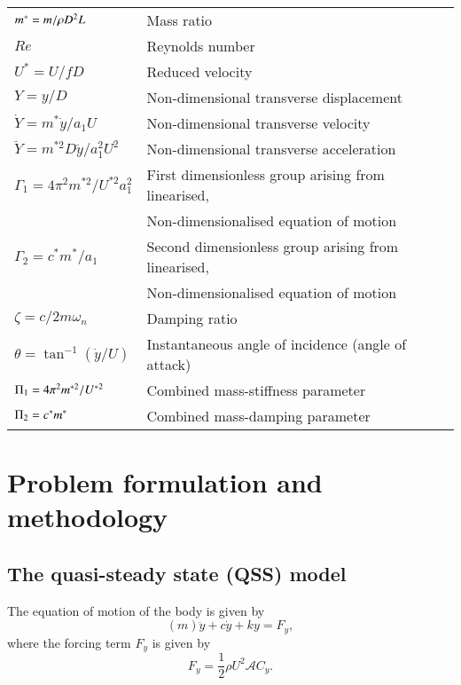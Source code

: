 \begin{longtable}{p{}p{}}
$m^{*}=m/\rho D^2L$ & Mass ratio \\
$Re$ & Reynolds number  \\
$U^*=U/fD$ & Reduced velocity  \\
$Y=y/D$ & Non-dimensional transverse displacement \\
$\dot{Y}=m^*\dot{y}/a_1U$ & Non-dimensional transverse velocity \\
$\ddot{Y}=m^{*2}D\ddot{y}/a_1^2U^2$ & Non-dimensional transverse acceleration \\
$\Gamma_1 = 4\pi^2m^{*2}/U^{*2}a_1^2$ & First dimensionless group arising from linearised,\\ 
& Non-dimensionalised equation of motion\\
$\Gamma_2 = c^*m^*/a_1$ & Second dimensionless group arising from linearised,\\
& Non-dimensionalised equation of motion \\
$\zeta= c/2 m \omega_n$ & Damping ratio \\
$\theta= \tan^{-1}{(\dot{y}/U)}$ & Instantaneous angle of incidence (angle of attack)\\
$\Pi_1 =  4\pi^2m^{*2}/U^{*2}$ & Combined mass-stiffness parameter\\
$\Pi_2 = c^*m^*$ & Combined mass-damping parameter\\
\end{longtable}  



\section{Problem formulation and methodology}
\label{sec:theory}

\subsection{The quasi-steady state (QSS) model}

The equation of motion of the body is given by 
\begin{equation}
\label{equationofmotion}
(m)\ddot{y}+c\dot{y}+ky=F_y,
\end{equation}
where the forcing term $F_y$ is given by
\begin{equation}
\label{lift equation}
F_y=\frac{1}{2}\rho U^2\mathcal{A}C_y.
\end{equation}


